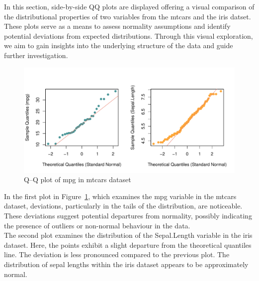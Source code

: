 \documentclass{article}\usepackage[]{graphicx}\usepackage[]{xcolor}
\makeatletter
\def\maxwidth{ %
  \ifdim\Gin@nat@width>\linewidth
    \linewidth
  \else
    \Gin@nat@width
  \fi
}
\newenvironment{knitrout}{}{} %
\numberwithin{equation}{section}
\makeatother
\begin{document}
\noindent In this section, side-by-side QQ plots are displayed offering a visual comparison of the distributional properties of two variables from the mtcars and the iris datset. These plots serve as a means to assess normality assumptions and identify potential deviations from expected distributions. Through this visual exploration, we aim to gain insights into the underlying structure of the data and guide further investigation.\\

\begin{knitrout}\scriptsize
{}\color{fgcolor}\begin{figure}[h]

{\centering \includegraphics[width=\maxwidth]{figure/beamer-QQplots-1} 

}

\caption[Q–Q plot of mpg in mtcars dataset]{Q–Q plot of mpg in mtcars dataset}\label{fig:QQplots}
\end{figure}

\end{knitrout}

\noindent In the first plot in Figure~\ref{fig:QQplots}, which examines the mpg variable in the mtcars dataset, deviations, particularly in the tails of the distribution, are noticeable. These deviations suggest potential departures from normality, possibly indicating the presence of outliers or non-normal behaviour in the data.\\

\noindent The second plot examines the distribution of the Sepal.Length variable in the iris dataset. Here, the points exhibit a slight departure from the theoretical quantiles line. The deviation is less pronounced compared to the previous plot. The distribution of sepal lengths within the iris dataset appears to be approximately normal.\\
\end{document}
